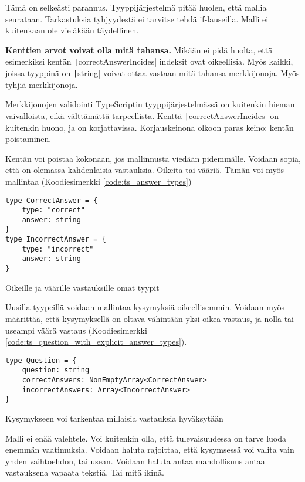 Tämä on selkeästi parannus. Tyyppijärjestelmä pitää huolen, että mallia seurataan. Tarkastuksia tyhjyydestä ei tarvitse tehdä if-lauseilla. Malli ei kuitenkaan ole vieläkään täydellinen.

\textbf{Kenttien arvot voivat olla mitä tahansa.} Mikään ei pidä huolta, että esimerkiksi kentän \texttt|correctAnswerIncides| indeksit ovat oikeellisia. Myös kaikki, joissa tyyppinä on \texttt|string| voivat ottaa vastaan mitä tahansa merkkijonoja. Myös tyhjiä merkkijonoja.

Merkkijonojen validointi TypeScriptin tyyppijärjestelmässä on kuitenkin hieman vaivalloista, eikä välttämättä tarpeellista. Kenttä \texttt|correctAnswerIncides| on kuitenkin huono, ja on korjattavissa. Korjauskeinona olkoon paras keino: kentän poistaminen.

Kentän voi poistaa kokonaan, jos mallinnusta viedään pidemmälle. Voidaan sopia, että on olemassa kahdenlaisia vastauksia. Oikeita tai vääriä. Tämän voi myös mallintaa (Koodiesimerkki \ref{code:ts_answer_types})

\begin{code}
    \begin{verbatim}
type CorrectAnswer = {
    type: "correct"
    answer: string
}
type IncorrectAnswer = {
    type: "incorrect"
    answer: string
}
    \end{verbatim}
    \caption{Oikeille ja väärille vastauksille omat tyypit}
    \label{code:ts_answer_types}
\end{code}

Uusilla tyypeillä voidaan mallintaa kysymyksiä oikeellisemmin. Voidaan myös määrittää, että kysymyksellä on oltava vähintään yksi oikea vastaus, ja nolla tai useampi väärä vastaus (Koodiesimerkki \ref{code:ts_question_with_explicit_answer_types}).

\begin{code}
    \begin{verbatim}
type Question = {
    question: string
    correctAnswers: NonEmptyArray<CorrectAnswer>
    incorrectAnswers: Array<IncorrectAnswer>
}
    \end{verbatim}
    \caption{Kysymykseen voi tarkentaa millaisia vastauksia hyväksytään}
    \label{code:ts_question_with_explicit_answer_types}
\end{code}

Malli ei enää valehtele. Voi kuitenkin olla, että tulevaisuudessa on tarve luoda enemmän vaatimuksia. Voidaan haluta rajoittaa, että kysymsessä voi valita vain yhden vaihtoehdon, tai usean. Voidaan haluta antaa mahdollisuus antaa vastauksena vapaata tekstiä. Tai mitä ikinä.

